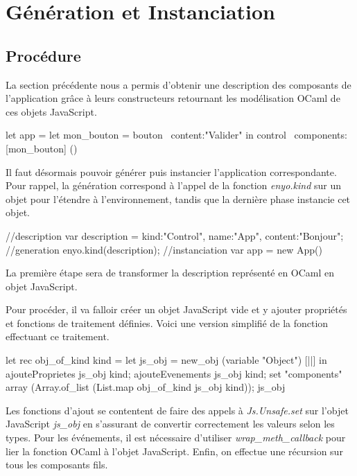 \documentclass[11pt,a4paper]{report}
\begin{document}
\section{Génération et Instanciation}
\subsection{Procédure}

La section précédente nous a permis d'obtenir une description des composants de l'application
grâce à leurs constructeurs retournant les modélisation OCaml de ces objets JavaScript.

\begin{OCaml}
let app = let mon_bouton = bouton ~content:"Valider" in
    control ~components:[mon_bouton] ()
\end{OCaml}

Il faut désormais pouvoir générer puis instancier l'application correspondante. Pour rappel, la génération
correspond à l'appel de la fonction \emph{enyo.kind} sur un objet pour l'étendre à l'environnement,
tandis que la dernière phase instancie cet objet.

\begin{JavaScript}
  //description
  var description = {kind:"Control", name:"App", content:"Bonjour"};
  //generation
  enyo.kind(description);
  //instanciation
  var app = new App()
\end{JavaScript}

La première étape sera de transformer la description représenté en OCaml en objet JavaScript.

Pour procéder, il va falloir créer un objet JavaScript vide et y ajouter propriétés et fonctions
de traitement définies. Voici une version simplifié de la fonction effectuant ce traitement.

\begin{OCaml}
  let rec obj_of_kind kind = 
      let js_obj = new_obj (variable "Object") [||] in
          ajouteProprietes js_obj kind;
          ajouteEvenements js_obj kind;
          set "components" array (Array.of_list (List.map obj_of_kind js_obj kind));
          js_obj
\end{OCaml}

Les fonctions d'ajout se contentent de faire des appels à 
\emph{Js.Unsafe.set} sur l'objet JavaScript \emph{js\_obj} en s'assurant de convertir
correctement les valeurs selon les types. Pour les événements, il est nécessaire
d'utiliser \emph{wrap\_meth\_callback} pour lier la fonction OCaml à l'objet JavaScript.
Enfin, on effectue une récursion sur tous les composants fils.
\end{document}
